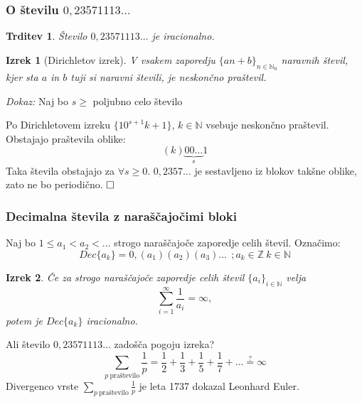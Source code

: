 \documentclass{beamer}
\def\N{\mathbb{N}} %
\def\Z{\mathbb{Z}} %
\def\qed{$\hfill\Box$}   %
\newtheorem{izrek}{Izrek}
\newtheorem{trditev}{Trditev}
\begin{document}
\begin{frame}
    \frametitle{O številu $0,23571113\dots$}
    \begin{trditev}
        Število $0,23571113 \dots$ je iracionalno.
    \end{trditev}
    \pause
    \begin{izrek}[Dirichletov izrek]
        \label{Dirichletov izrek}
        V vsakem zaporedju $ \lbrace an + b \rbrace_{n \in \N_0}$ naravnih števil, kjer sta $a$ in $b$
        tuji si naravni števili, je neskončno praštevil.
    \end{izrek}
    \pause
    \emph{Dokaz:} Naj bo $s \geq$ poljubno celo število
    
    Po Dirichletovem izreku $ \{10^{s+1}k + 1\}$, $k \in \N$ vsebuje neskončno praštevil.
    \pause
    Obstajajo praštevila oblike:
    \[(k)\underbrace{00 \dots}_{s}1\]
    \pause
    Taka števila obstajajo za $\forall s \geq 0$.
    $0,2357\dots$ je sestavljeno iz blokov takšne oblike, zato ne bo periodično.
    \qed

\end{frame}

\begin{frame}
    \frametitle{Decimalna števila z naraščajočimi bloki}
    \pause
    Naj bo $1 \leq a_1 < a_2 < \dots $ strogo naraščajoče zaporedje celih števil. 
    Označimo: \[Dec\{a_k\} = 0,(a_1)(a_2)(a_3)... \  \ ;  a_k \in \Z \ k \in \N \]
    \pause

    \begin{izrek}
        Če za strogo naraščajoče zaporedje celih števil $\{a_i\}_{i \in \N}$ velja 
        \[ \sum_{i=1}^{\infty} \frac{1}{a_i} = \infty ,\]
        potem je $Dec\{a_k\}$ iracionalno.
    \end{izrek}

\end{frame}

\begin{frame}
    Ali število $0,23571113\dots$ zadošča pogoju izreka?
    \pause
    \[
        \sum_{p \ \text{praštevilo}}\frac{1}{p} =
        \frac{1}{2} + \frac{1}{3} + \frac{1}{5} + \frac{1}{7} + \dots \overset{?}{=} \infty \]
    \pause
    Divergenco vrste $\sum_{p \ \text{praštevilo}}\frac{1}{p}$ je leta 1737 dokazal Leonhard Euler.

\end{frame}
\end{document}
